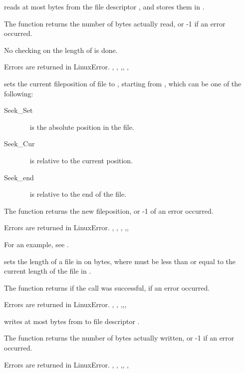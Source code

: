 

{  reads at most  bytes from the file descriptor
, and stores them in . 

The function returns the number of bytes actually read, or -1 if
an error occurred.

No checking on the length of  is done.
}
{Errors are returned in LinuxError.}
{, , ,,
, }



{ sets the current fileposition of file  to
, starting from , which can be one of the following:
\begin{description}
\item [Seek\_Set] \  is the absolute position in the file.
\item [Seek\_Cur] \  is relative to the current position.
\item [Seek\_end] \  is relative to the end of the file.
\end{description}

The function returns the new fileposition, or -1 of an error occurred.
}
{Errors are returned in LinuxError.}
{, , ,
,,
 }

For an example, see .

{ sets the length of a file in  on 
bytes, where  must be less than or equal to the current length of
the file in .

The function returns  if the call was successful,  if
an error occurred.}
{Errors are returned in LinuxError.}
{, , ,,,
}

{ writes at most  bytes from  to
file descriptor .

The function returns the number of bytes actually written, or -1 if an error
occurred.
}
{Errors are returned in LinuxError.}
{, , ,,
, }

